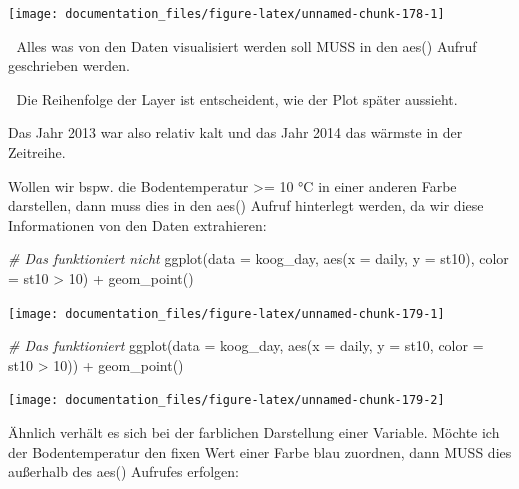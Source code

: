 \documentclass[
]{article}
\newenvironment{Shaded}{\begin{snugshade}}{\end{snugshade}}
\newcommand{\AttributeTok}[1]{\textcolor[rgb]{0.77,0.63,0.00}{#1}}
\newcommand{\CommentTok}[1]{\textcolor[rgb]{0.56,0.35,0.01}{\textit{#1}}}
\newcommand{\DecValTok}[1]{\textcolor[rgb]{0.00,0.00,0.81}{#1}}
\newcommand{\FunctionTok}[1]{\textcolor[rgb]{0.00,0.00,0.00}{#1}}
\newcommand{\NormalTok}[1]{#1}
\newcommand{\SpecialCharTok}[1]{\textcolor[rgb]{0.00,0.00,0.00}{#1}}
\begin{document}
\begin{center}\texttt{[image: documentation\_files/figure-latex/unnamed-chunk-178-1]} \end{center}

🚨 Alles was von den Daten visualisiert werden soll MUSS in den aes() Aufruf geschrieben werden.

🚨 Die Reihenfolge der Layer ist entscheident, wie der Plot später aussieht.

Das Jahr 2013 war also relativ kalt und das Jahr 2014 das wärmste in der Zeitreihe.

Wollen wir bspw. die Bodentemperatur \textgreater= 10 °C in einer anderen Farbe darstellen, dann muss dies in den aes() Aufruf hinterlegt werden, da wir diese Informationen von den Daten extrahieren:

\begin{Shaded}
\begin{Highlighting}[]
\CommentTok{\# Das funktioniert nicht}
\FunctionTok{ggplot}\NormalTok{(}\AttributeTok{data =}\NormalTok{ koog\_day, }\FunctionTok{aes}\NormalTok{(}\AttributeTok{x =}\NormalTok{ daily, }\AttributeTok{y =}\NormalTok{ st10), }\AttributeTok{color =}\NormalTok{ st10 }\SpecialCharTok{\textgreater{}} \DecValTok{10}\NormalTok{) }\SpecialCharTok{+}
  \FunctionTok{geom\_point}\NormalTok{()}
\end{Highlighting}
\end{Shaded}

\begin{center}\texttt{[image: documentation\_files/figure-latex/unnamed-chunk-179-1]} \end{center}

\begin{Shaded}
\begin{Highlighting}[]
\CommentTok{\# Das funktioniert}
\FunctionTok{ggplot}\NormalTok{(}\AttributeTok{data =}\NormalTok{ koog\_day, }\FunctionTok{aes}\NormalTok{(}\AttributeTok{x =}\NormalTok{ daily, }\AttributeTok{y =}\NormalTok{ st10, }\AttributeTok{color =}\NormalTok{ st10 }\SpecialCharTok{\textgreater{}} \DecValTok{10}\NormalTok{)) }\SpecialCharTok{+}
  \FunctionTok{geom\_point}\NormalTok{()}
\end{Highlighting}
\end{Shaded}

\begin{center}\texttt{[image: documentation\_files/figure-latex/unnamed-chunk-179-2]} \end{center}

Ähnlich verhält es sich bei der farblichen Darstellung einer Variable. Möchte ich der Bodentemperatur den fixen Wert einer Farbe blau zuordnen, dann MUSS dies außerhalb des aes() Aufrufes erfolgen:
\end{document}
